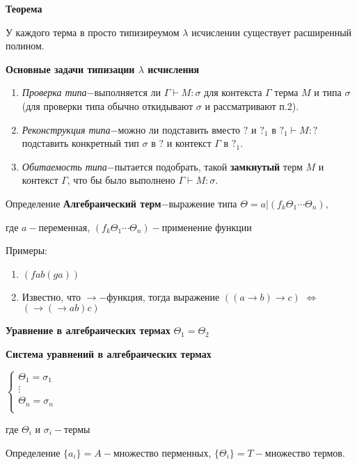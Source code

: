 \documentclass[12pt, a4paper]{article}
\begin{document}
	\par \textbf{Теорема}\par 
		У каждого терма в просто типизиреумом $\lambda$ исчислении существует расширенный полином.\par	
	\textbf{Основные задачи типизации $\lambda$ исчисления}\par
		\begin{enumerate}
			\item \emph{Проверка типа$-$}выполняется ли $\Gamma\vdash M:\sigma$ для контекста $\Gamma\text{ терма }M\text{ и типа }\sigma$ (для проверки типа обычно откидывают $\sigma$ и рассматривают п.2).
			\item \emph{Реконструкция типа$-$}можно ли подставить вместо $?$ и $?_1$ в $?_1\vdash M:?$ подставить конкретный тип $\sigma$ в $?$ и контекст $\Gamma$ в $?_1$.
			\item \emph{Обитаемость типа$-$}пытается подобрать, такой \textbf{замкнутый} терм $M$ и контекст $\Gamma$, что бы было выполнено $\Gamma\vdash M:\sigma$.
		\end{enumerate}			
	\par Определение \textbf{Алгебраический терм}$-$выражение типа $\Theta=a|(f_k \Theta_1\dotsb\Theta_n)$, \par где $a-$переменная, $(f_k \Theta_1\dotsb\Theta_n)-$применение функции\par
	Примеры:
	\begin{enumerate}
	\item $(f a b ( g a))$ 
	\item Известно, что $\to-$функция, тогда выражение $((a\to b)\to c)$ $\Longleftrightarrow$ $(\to (\to a b) c)$
\end{enumerate}		
	\par \textbf{Уравнение в алгебраических термах} $\Theta_1=\Theta_2$\par
	\par \textbf{Система уравнений в алгебраических термах}\par
	$		
		\begin{cases}			
			\Theta_1=\sigma_1&\\
			\vdots&\\
			\Theta_n=\sigma_n&\\
		\end{cases}
	$\par где $\Theta_i \text{ и } \sigma_i-\text{термы}$\par
	\par Определение $\{a_i\}=A-$множество перменных, $\{\Theta_i\}=T-$множество термов.\par
\end{document}
